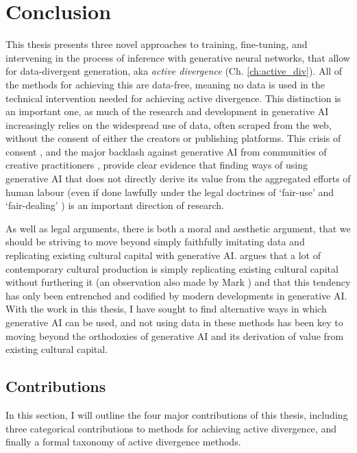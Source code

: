 \chapter{Conclusion}
\label{ch:conclusion}

This thesis presents three novel approaches to training, fine-tuning, and intervening in the process of inference with generative neural networks, that allow for data-divergent generation, aka \textit{active divergence} (Ch. \ref{ch:active_div}).
All of the methods for achieving this are data-free, meaning no data is used in the technical intervention needed for achieving active divergence.
This distinction is an important one, as much of the research and development in generative AI increasingly relies on the widespread use of data, often scraped from the web, without the consent of either the creators or publishing platforms.
This crisis of consent \citep{longpre2024consent}, and the major backlash against generative AI from communities of creative practitioners \citep{whiddington2022backlash}, provide clear evidence that finding ways of using generative AI that does not directly derive its value from the aggregated efforts of human labour (even if done lawfully under the legal doctrines of `fair-use' \citep{sobel2017artificial,alhadeff2024limits} and `fair-dealing' \citep{guadamuz2023scanner}) is an important direction of research.

As well as legal arguments, there is both a moral and aesthetic argument, that we should be striving to move beyond simply faithfully imitating data and replicating existing cultural capital with generative AI. 
\cite{rafferty2016future} argues that a lot of contemporary cultural production is simply replicating existing cultural capital without furthering it (an observation also made by Mark \cite{fisher2009capitalist}) and that this tendency has only been entrenched and codified by modern developments in generative AI.
With the work in this thesis, I have sought to find alternative ways in which generative AI can be used, and not using data in these methods has been key to moving beyond the orthodoxies of generative AI and its derivation of value from existing cultural capital.

\section{Contributions}

In this section, I will outline the four major contributions of this thesis, including three categorical contributions to methods for achieving active divergence, and finally a formal taxonomy of active divergence methods.

